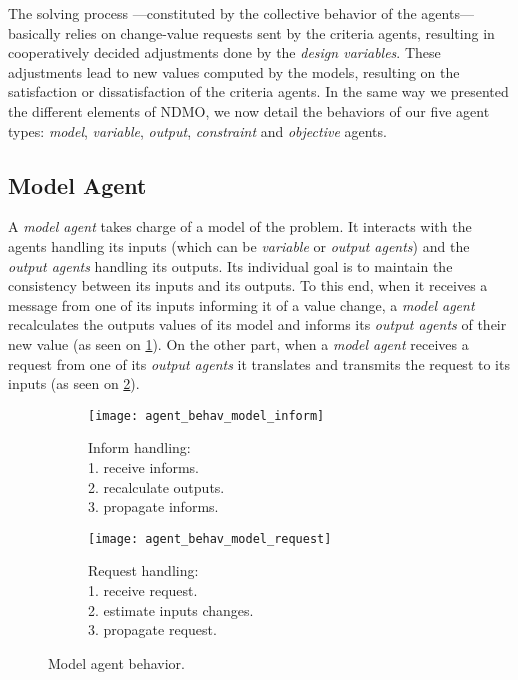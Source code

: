 The solving process ---constituted by the collective behavior of the agents--- basically relies on change-value requests sent by the criteria agents, resulting in cooperatively decided adjustments done by the \emph{design variables}. These adjustments lead to new values computed by the models, resulting on the satisfaction or dissatisfaction of the criteria agents. 
In the same way we presented the different elements of NDMO, we now detail the behaviors of our five agent types: \emph{model}, \emph{variable}, \emph{output}, \emph{constraint} and \emph{objective} agents.

\subsection{Model Agent}

A \emph{model agent} takes charge of a model of the problem. It interacts with the agents handling its inputs (which can be \emph{variable} or \emph{output agents}) and the \emph{output agents} handling its outputs. Its individual goal is to maintain the consistency between its inputs and its outputs. To this end, when it receives a message from one of its inputs informing it of a value change, a \emph{model agent} recalculates the outputs values of its model and informs its \emph{output agents} of their new value (as seen on \figurename{} \ref{agent_behav_model:inf}). On the other part, when a \emph{model agent} receives a request from one of its \emph{output agents} it translates and transmits the request to its inputs (as seen on \figurename{} \ref{agent_behav_model:req}). 

\begin{figure}
\centering
\begin{subfigure}{0.35\textwidth}
		\centering
		\texttt{[image: agent\_behav\_model\_inform]}
		\caption{Inform handling:\\1. receive informs.\\2. recalculate outputs.\\3. propagate informs.}\label{agent_behav_model:inf}
\end{subfigure}
\qquad
\begin{subfigure}{0.35\textwidth}
		\centering
		\texttt{[image: agent\_behav\_model\_request]}
		\caption{Request handling:\\1. receive request.\\2. estimate inputs changes.\\3. propagate request.}\label{agent_behav_model:req}
\end{subfigure}
\caption{Model agent behavior.}\label{agent_behav_model}
\end{figure}


